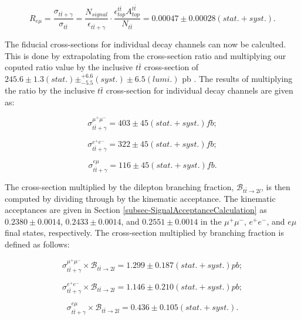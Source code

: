 \begin{equation}
	R_{e\mu} = \frac{\sigma_{t\bar{t}+\gamma}}{\sigma_{t\bar{t}}} = \frac{N_{signal}}{\epsilon_{t\bar{t}+\gamma}} \cdot \frac{\epsilon^{t\bar{t}}_{top} A^{t\bar{t}}_{top}}{N_{t\bar{t}}} = 0.00047 \pm 0.00028 (stat. + syst.).
\end{equation}


 The fiducial cross-sections for individual decay channels can now be calculted. This is done by extrapolating from the cross-section ratio and multiplying our coputed ratio value by the inclusive $t\bar{t}$ cross-section of $245.6 \pm 1.3(stat.) \pm_{-5.5}^{+6.6}(syst.) \pm 6.5(lumi.)$ pb \cite{Khachatryan:2016mqs}. The results of multiplying the ratio by the inclusive $t\bar{t}$ cross-section for individual decay channels are given as:

\begin{equation}
	\sigma_{t\bar{t}+\gamma}^{\mu^+\mu^-} = 403 \pm 45 (stat. + syst.) fb;
\end{equation}

\begin{equation}
	\sigma_{t\bar{t}+\gamma}^{e^+e^-} = 322 \pm 45 (stat. + syst.) fb;
\end{equation}

\begin{equation}
	\sigma_{t\bar{t}+\gamma}^{e\mu} = 116 \pm 45 (stat. + syst.) fb.
\end{equation}

 The cross-section multiplied by the dilepton branching fraction, $\mathcal{B}_{t\bar{t}\to2l}$, is then computed by dividing through by the kinematic acceptance. The kinematic acceptances are given in Section \ref{subsec-SignalAcceptanceCalculation} as $0.2380 \pm 0.0014$, $0.2433 \pm 0.0014$, and $0.2551 ± 0.0014$ in the $\mu^+\mu^-$, $e^+e^-$, and $e\mu$ final states, respectively. The cross-section multiplied by branching fraction is defined as follows:

\begin{equation}
	\sigma_{t\bar{t}+\gamma}^{\mu^+\mu^-}\times \mathcal{B}_{t\bar{t}\to2l} = 1.299 \pm 0.187 (stat. + syst.) pb;
\end{equation}

\begin{equation}
	\sigma_{t\bar{t}+\gamma}^{e^+e^-}\times \mathcal{B}_{t\bar{t}\to2l}  = 1.146 \pm 0.210 (stat. + syst.) pb;
\end{equation}

\begin{equation}
	\sigma_{t\bar{t}+\gamma}^{e\mu}\times \mathcal{B}_{t\bar{t}\to2l}  = 0.436 \pm 0.105 (stat. + syst.).
\end{equation}

